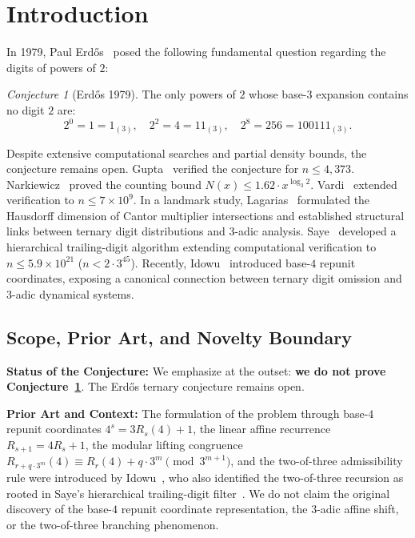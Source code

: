\documentclass[11pt,reqno]{amsart}
\theoremstyle{plain}
\theoremstyle{definition}
\theoremstyle{remark}
\newtheorem{conjecture}[theorem]{Conjecture}
\begin{document}
\maketitle


\newpage
\tableofcontents
\clearpage

\section{Introduction}

In 1979, Paul Erd\H{o}s~\cite{Erdos1979} posed the following fundamental question regarding the digits of powers of $2$:
\begin{conjecture}[Erd\H{o}s 1979]\label{conj:erdos}
The only powers of $2$ whose base-$3$ expansion contains no digit $2$ are:
\begin{equation}
2^0 = 1 = 1_{(3)}, \quad 2^2 = 4 = 11_{(3)}, \quad 2^8 = 256 = 100111_{(3)}.
\end{equation}
\end{conjecture}

Despite extensive computational searches and partial density bounds, the conjecture remains open. Gupta~\cite{Gupta1978} verified the conjecture for $n \le 4,373$. Narkiewicz~\cite{Narkiewicz1980} proved the counting bound $N(x) \le 1.62 \cdot x^{\log_3 2}$. Vardi~\cite{Vardi1991} extended verification to $n \le 7 \times 10^9$. In a landmark study, Lagarias~\cite{Lagarias2009} formulated the Hausdorff dimension of Cantor multiplier intersections and established structural links between ternary digit distributions and $3$-adic analysis. Saye~\cite{Saye2022} developed a hierarchical trailing-digit algorithm extending computational verification to $n \le 5.9 \times 10^{21}$ ($n < 2 \cdot 3^{45}$). Recently, Idowu~\cite{Idowu2026} introduced base-$4$ repunit coordinates, exposing a canonical connection between ternary digit omission and $3$-adic dynamical systems.

\subsection{Scope, Prior Art, and Novelty Boundary}
\textbf{Status of the Conjecture:} We emphasize at the outset: \textbf{we do not prove Conjecture~\ref{conj:erdos}}. The Erd\H{o}s ternary conjecture remains open.

\textbf{Prior Art and Context:} The formulation of the problem through base-$4$ repunit coordinates $4^s = 3 R_s(4) + 1$, the linear affine recurrence $R_{s+1} = 4 R_s + 1$, the modular lifting congruence $R_{r + q \cdot 3^m}(4) \equiv R_r(4) + q \cdot 3^m \pmod{3^{m+1}}$, and the two-of-three admissibility rule were introduced by Idowu~\cite{Idowu2026}, who also identified the two-of-three recursion as rooted in Saye's hierarchical trailing-digit filter~\cite{Saye2022}. We do not claim the original discovery of the base-$4$ repunit coordinate representation, the $3$-adic affine shift, or the two-of-three branching phenomenon.
\end{document}
